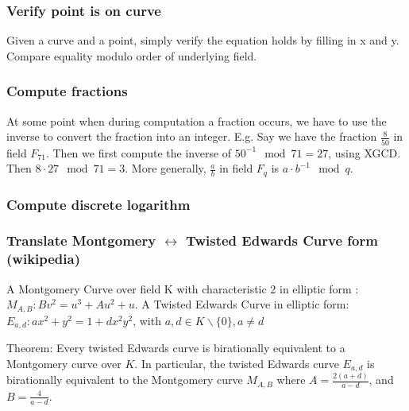 \documentclass{article}
\begin{document}



\subsubsection{Verify point is on curve}
Given a curve and a point, simply verify the equation holds by filling in x and y.
Compare equality modulo order of underlying field.

\subsubsection{Compute fractions}
At some point when during computation a fraction occurs, we have to use the inverse to convert the fraction into an integer.
E.g. Say we have the fraction $\frac{8}{50}$ in field $F_{71}$. Then we first
compute the inverse of $50^{-1} \mod 71 = 27$, using XGCD. Then $8 \cdot 27 \mod 71 =
3$. More generally, $\frac{a}{b}$ in field $F_q$ is $a \cdot b^{-1} \mod q$.

\subsubsection{Compute discrete logarithm}


\subsubsection{Translate Montgomery $\leftrightarrow$ Twisted Edwards Curve form (wikipedia)}
A Montgomery Curve over field K with characteristic 2 in elliptic form : $M_{A,B}: Bv^2 = u^3 + Au^2 + u$.
A Twisted Edwards Curve in elliptic form: $E_{a,d}: ax^2 + y^2 = 1 + dx^2y^2$, with $a,d \in K \backslash \{0\}, a \not= d$

Theorem: Every twisted Edwards curve is birationally equivalent  to a Montgomery curve over $K$.
In  particular, the twisted Edwards curve $E_{a,d}$ is birationally equivalent to the Montgomery curve $M_{A,B}$ where $A = \frac{2(a+d)}{a-d}$, and $B = \frac{4}{a-d}$.
\end{document}
